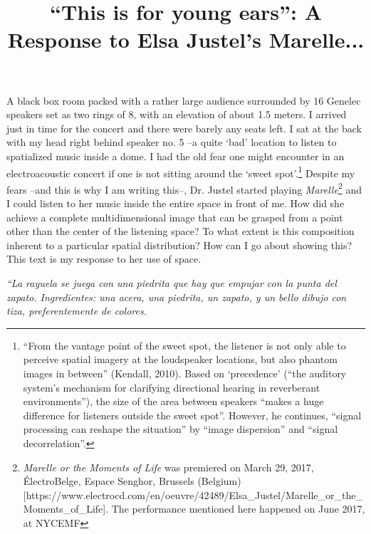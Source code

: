 \documentclass{article}
\title{``This is for young ears'': A Response to Elsa Justel's Marelle...}
\begin{document}
\maketitle

A black box room packed with a rather large audience surrounded by 16 Genelec speakers set as two rings of 8, with an elevation of about 1.5 meters. I arrived just in time for the concert and there were barely any seats left. I sat at the back with my head right behind speaker no. 5 --a quite `bad' location to listen to spatialized music inside a dome. I had the old fear one might encounter in an electroacoustic concert if one is not sitting around the `sweet spot'.\footnote{``From the vantage point of the sweet spot, the listener is not only able to perceive spatial imagery at the loudspeaker locations, but also phantom images in between'' (Kendall, 2010). Based on `precedence' (``the auditory system's mechanism for clarifying directional hearing in reverberant environments''), the size of the area between speakers ``makes a huge difference for listeners outside the sweet spot''. However, he continues, ``signal processing can reshape the situation'' by ``image dispersion'' and ``signal decorrelation''. } Despite my fears --and this is why I am writing this--, Dr. Justel started playing \textit{Marelle}\footnote{\textit{Marelle or the Moments of Life} was premiered on March 29, 2017, \'ElectroBelge, Espace Senghor, Brussels (Belgium) [https://www.electrocd.com/en/oeuvre/42489/Elsa\_Justel/Marelle\_or\_the\_Moments\_of\_Life]. The performance mentioned here happened on June 2017, at NYCEMF} and I could listen to her music inside the entire space in front of me. How did she achieve a complete multidimensional image that can be grasped from a point other than the center of the listening space? To what extent is this composition inherent to a particular spatial distribution? How can I go about showing this? This text is my response to her use of space. 


\begin{flushright}
\textit{
``La rayuela se juega con una piedrita que hay que empujar con la punta del zapato. Ingredientes: una acera, una piedrita, un zapato, y un bello dibujo con tiza, preferentemente de colores. }
\end{flushright}
\end{document}
